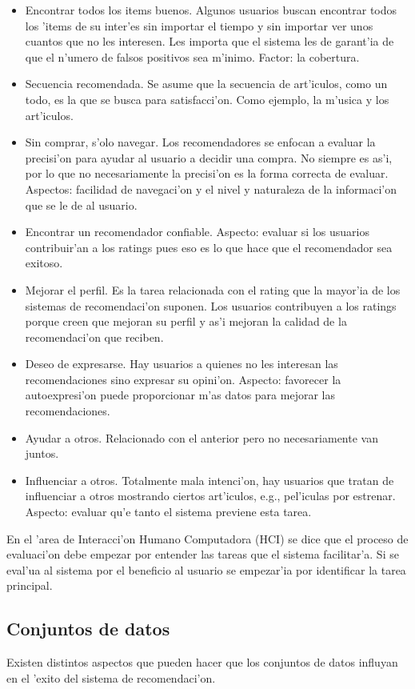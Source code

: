 \documentclass[11pt]{article}
\begin{document}
\begin{itemize}
\item Encontrar todos los items buenos. Algunos usuarios buscan encontrar todos los 'items de su inter'es sin importar el tiempo y sin importar ver unos cuantos que no les interesen. Les importa que el sistema les de garant'ia de que el n'umero de falsos positivos sea m'inimo. Factor: la cobertura.
\item Secuencia recomendada. Se asume que la secuencia de art'iculos, como un todo, es la que se busca para satisfacci'on. Como ejemplo, la m'usica y los art'iculos.
\item Sin comprar, s'olo navegar. Los recomendadores se enfocan a evaluar la precisi'on para ayudar al usuario a decidir una compra. No siempre es as'i, por lo que no necesariamente la precisi'on es la forma correcta de evaluar. Aspectos: facilidad de navegaci'on y el nivel y naturaleza de la informaci'on que se le de al usuario.
\item Encontrar un recomendador confiable. Aspecto: evaluar si los usuarios contribuir'an a los ratings pues eso es lo que hace que el recomendador sea exitoso.
\item Mejorar el perfil. Es la tarea relacionada con el rating que la mayor'ia de los sistemas de recomendaci'on suponen. Los usuarios contribuyen a los ratings porque creen que mejoran su perfil y as'i mejoran la calidad de la recomendaci'on que reciben.
\item Deseo de expresarse. Hay usuarios a quienes no les interesan las recomendaciones sino expresar su opini'on. Aspecto: favorecer la autoexpresi'on puede proporcionar m'as datos para mejorar las recomendaciones.
\item Ayudar a otros. Relacionado con el anterior pero no necesariamente van juntos.
\item Influenciar a otros. Totalmente mala intenci'on, hay usuarios que tratan de influenciar a otros mostrando ciertos art'iculos, e.g., pel'iculas por estrenar. Aspecto: evaluar qu'e tanto el sistema previene esta tarea.
\end{itemize}
En el 'area de Interacci'on Humano Computadora (HCI) se dice que el proceso de evaluaci'on debe empezar por entender las tareas que el sistema facilitar'a. Si se eval'ua al sistema por el beneficio al usuario se empezar'ia por identificar la tarea principal.
\subsection{Conjuntos de datos}
Existen distintos aspectos que pueden hacer que los conjuntos de datos influyan en el 'exito del sistema de recomendaci'on.
\end{document}
